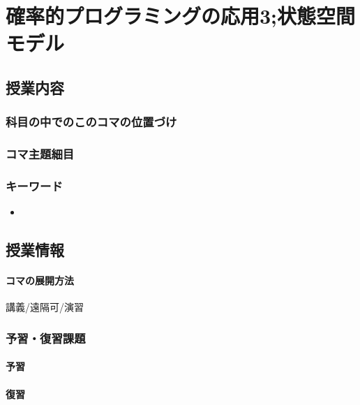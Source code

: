 \section{確率的プログラミングの応用3;状態空間モデル}
\subsection{授業内容}
\subsubsection{科目の中でのこのコマの位置づけ}
\subsubsection{コマ主題細目}
\begin{description}
    \item[]
\end{description}
\subsubsection{キーワード}
\begin{itemize}
    \item
\end{itemize}
\subsection{授業情報}
\paragraph{コマの展開方法}
講義/遠隔可/演習
\subsubsection{予習・復習課題}
\paragraph{予習}
\paragraph{復習}